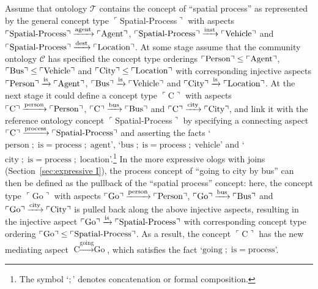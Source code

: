\documentclass{amsart}
\newcommand{\fakebox}[1]{\tn{$\ulcorner$#1$\urcorner$}}
\theoremstyle{remark}
\theoremstyle{definition}
\def\tn{\textnormal}
\begin{document}
Assume that ontology $\mathcal{T}$
contains the concept of ``spatial process'' 
as represented by
the general concept type \fakebox{Spatial-Process} with aspects
$\fakebox{Spatial-Process}\xrightarrow{\text{agent}}\fakebox{Agent}$, 
$\fakebox{Spatial-Process}\xrightarrow{\text{inst}}\fakebox{Vehicle}$ and 
$\fakebox{Spatial-Process}\xrightarrow{\text{dest}}\fakebox{Location}$.
%
At some stage assume that the community ontology $\mathcal{C}$
has specified
the concept type orderings
$\fakebox{Person}\leq\fakebox{Agent}$,
$\fakebox{Bus}\leq\fakebox{Vehicle}$ and
$\fakebox{City}\leq\fakebox{Location}$
with corresponding injective aspects
$\fakebox{Person}\xrightarrow{\text{is}}\fakebox{Agent}$,
$\fakebox{Bus}\xrightarrow{\text{is}}\fakebox{Vehicle}$ and
$\fakebox{City}\xrightarrow{\text{is}}\fakebox{Location}$.
At the next stage it could
define
a concept type \fakebox{C}
with aspects
$\fakebox{C}\xrightarrow{\text{person}}\fakebox{Person}$, 
$\fakebox{C}\xrightarrow{\text{bus}}\fakebox{Bus}$ and 
$\fakebox{C}\xrightarrow{\text{city}}\fakebox{City}$,
and link it 
with the reference ontology concept \fakebox{Spatial-Process}
by specifying a connecting aspect
$\fakebox{C}\xrightarrow{\text{process}}\fakebox{Spatial-Process}$
and
asserting the facts
`$\mbox{person} {\;;\;} \mbox{is} = \mbox{process} {\;;\;} \mbox{agent}$', 
`$\mbox{bus} {\;;\;} \mbox{is} = \mbox{process} {\;;\;} \mbox{vehicle}$' and 
`$\mbox{city} {\;;\;} \mbox{is} = \mbox{process} {\;;\;} \mbox{location}$'.\footnote{The symbol `$;$' denotes concatenation or formal composition.}
%
In the more expressive ologs with joins (Section~\ref{sec:expressive I}),
the process concept of ``going to city by bus'' can then be defined
as the pullback of the ``spatial process'' concept:
here,
the concept type \fakebox{Go}
with aspects
$\fakebox{Go}\xrightarrow{\text{person}}\fakebox{Person}$, 
$\fakebox{Go}\xrightarrow{\text{bus}}\fakebox{Bus}$ and 
$\fakebox{Go}\xrightarrow{\text{city}}\fakebox{City}$
is pulled back along the above injective aspects,
resulting in the
injective aspect $\fakebox{Go}\xrightarrow{\text{is}}\fakebox{Spatial-Process}$
with corresponding concept type ordering
$\fakebox{Go}\leq\fakebox{Spatial-Process}$.
As a result,
the concept \fakebox{C} has the new mediating aspect
$\mbox{C}\xrightarrow{\text{going}}\mbox{Go}$,
which satisfies the fact
`$\mbox{going} {\;;\;} \mbox{is} = \mbox{process}$'.
\end{document}
